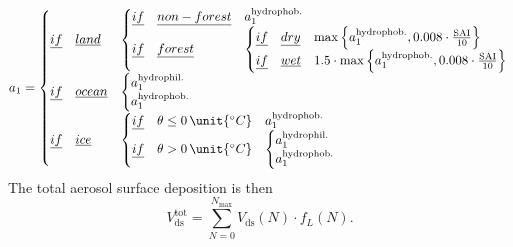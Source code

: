 \documentclass[gmd, manuscript]{copernicus}
\begin{document}
\begin{equation}
  a_1 =
  \begin{cases}
    \emph{if} \quad \emph{land} &
    \begin{cases}
      \emph{if} \quad \emph{non-forest} &  a_1^\text{hydrophob.}\\
      \emph{if} \quad \emph{forest} &
      \begin{cases}
        \emph{if} \quad \emph{dry} & \max{\left\{a_1^\text{hydrophob.}, 0.008\cdot\frac{\text{SAI}}{10}\right\}}\\
        \emph{if} \quad \emph{wet} & 1.5\cdot\max{\left\{a_1^\text{hydrophob.}, 0.008\cdot\frac{\text{SAI}}{10}\right\}}\\
    \end{cases}\\
    \end{cases}\\
    \emph{if} \quad \emph{ocean} &
    \begin{cases}
      a_1^\text{hydrophil.}\\
      a_1^\text{hydrophob.}\\
    \end{cases}\\
    \emph{if} \quad \emph{ice} &
    \begin{cases}
      \emph{if} \quad \theta \le 0\,\unit{^\circ C} & a_1^\text{hydrophob.}\\
      \emph{if} \quad \theta > 0\,\unit{^\circ C} &
      \begin{cases}
        a_1^\text{hydrophil.}\\
        a_1^\text{hydrophob.}\\
      \end{cases}\\
    \end{cases}\\
  \end{cases}
  \label{eq:dd_aerosol_a1}
\end{equation}
%
The total aerosol surface deposition is then
\begin{equation}
 V_\text{ds}^\text{tot} = \sum_{N=0}^{N_\text{max}} V_\text{ds}(N) \cdot f_L(N).
\end{equation}
%
\end{document}
